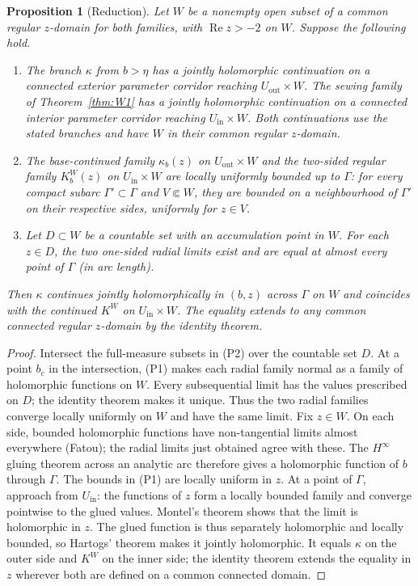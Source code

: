 \documentclass[11pt,a4paper]{article}
\newtheorem{proposition}[theorem]{Proposition}
\theoremstyle{definition}
\newcommand{\Kk}{K}
\begin{document}
\begin{proposition}[Reduction]\label{prop:brjuno}
Let $W$ be a nonempty open subset of a common regular $z$-domain for both
families, with $\operatorname{Re}z>-2$ on $W$.  Suppose the following hold.
\begin{enumerate}
\item[(P0)] The branch $\kappa$ from $b>\eta$ has a jointly holomorphic
  continuation on a connected exterior parameter corridor reaching
  $U_{\mathrm{out}}\times W$.  The sewing family of
  Theorem~\ref{thm:W1} has a jointly holomorphic continuation on a
  connected interior parameter corridor reaching $U_{\mathrm{in}}\times W$.
  Both continuations use the stated branches and have $W$ in their common
  regular $z$-domain.
\item[(P1)] The base-continued family $\kappa_b(z)$ on
  $U_{\mathrm{out}}\times W$ and the two-sided regular family
  $\Kk^W_b(z)$ on $U_{\mathrm{in}}\times W$ are locally uniformly bounded
  up to $\Gamma$: for every compact subarc $\Gamma'\subset\Gamma$ and
  $V\Subset W$, they are bounded on a neighbourhood of $\Gamma'$ on their
  respective sides, uniformly for $z\in V$.
\item[(P2)] Let $D\subset W$ be a countable set with an accumulation point
  in $W$.  For each $z\in D$, the two one-sided radial limits exist and
  are equal at almost every point of $\Gamma$ (in arc length).
\end{enumerate}
Then $\kappa$ continues jointly holomorphically in $(b,z)$ across $\Gamma$
on $W$ and coincides with the continued $\Kk^W$ on
$U_{\mathrm{in}}\times W$.
The equality extends to any common connected regular $z$-domain by the
identity theorem.
\end{proposition}

\begin{proof}
Intersect the full-measure subsets in (P2) over the countable set $D$.
At a point $b_c$ in the intersection, (P1) makes each radial family normal
as a family of holomorphic functions on $W$.  Every subsequential limit
has the values prescribed on $D$; the identity theorem makes it unique.
Thus the two radial families converge locally uniformly on $W$ and have
the same limit.  Fix $z\in W$.  On each side, bounded holomorphic functions
have non-tangential limits almost everywhere (Fatou); the radial limits
just obtained agree with these.
The $H^\infty$ gluing theorem across an analytic arc therefore gives a
holomorphic function of $b$ through $\Gamma$.  The bounds in (P1) are locally
uniform in $z$.  At a point of $\Gamma$, approach from $U_{\mathrm{in}}$:
the functions of $z$ form a locally bounded family and converge pointwise to
the glued values.  Montel's theorem shows that the limit is holomorphic in
$z$.  The glued function is thus separately holomorphic and locally bounded,
so Hartogs' theorem makes it jointly holomorphic.  It equals $\kappa$ on the
outer side and $\Kk^W$ on the inner side; the identity theorem extends the
equality in $z$ wherever both are defined on a common connected domain.
\end{proof}
\end{document}
